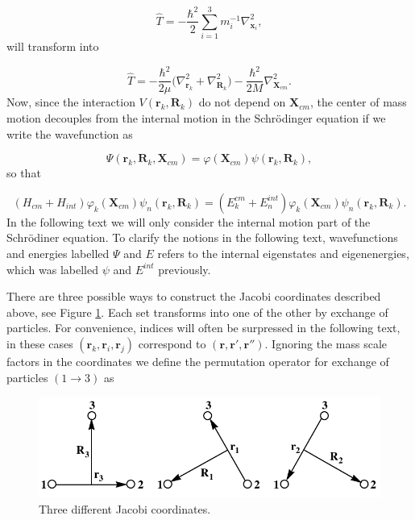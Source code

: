 \documentclass{article}
\begin{document}
\begin{equation}\label{eq:5}
\hat{T} = -\frac{\hbar^2}{2} \sum_{i=1}^{3} m_{i}^{-1} \nabla^{2}_{\mathbf{x}_{i}}, 
\end{equation}
will transform into

\begin{equation}\label{eq:6}
\hat{T} = -\frac{\hbar^2}{2\mu} \Big(\nabla^{2}_{\mathbf{r}_{k}}+\nabla^{2}_{\mathbf{R}_{k}}\Big) - \frac{\hbar^2}{2 M}\nabla^{2}_{\mathbf{X}_{cm}}. 
\end{equation}
Now, since the interaction $V(\mathbf{r}_k,\mathbf{R}_k)$ do not depend on $\mathbf{X}_{cm}$, the center of mass motion decouples from the internal motion in the Schr{\"o}dinger equation if we write the wavefunction as

\begin{equation}
\Psi(\mathbf{r}_k,\mathbf{R}_k,\mathbf{X}_{cm}) = \varphi(\mathbf{X}_{cm})\psi(\mathbf{r}_k,\mathbf{R}_k),
\end{equation}
so that

\begin{equation}
(H_{cm} + H_{int})\varphi_{k}(\mathbf{X}_{cm})\psi_{n}(\mathbf{r}_k,\mathbf{R}_k) = (E_k^{cm} + E_n^{int})\varphi_{k}(\mathbf{X}_{cm})\psi_{n}(\mathbf{r}_k,\mathbf{R}_k).
\end{equation}
In the following text we will only consider the internal motion part of the  Schr{\"o}diner equation. To clarify the notions in the following text, wavefunctions and energies labelled $\Psi$ and $E$ refers to the internal eigenstates and eigenenergies, which was labelled $\psi$ and $E^{int}$ previously. 

There are three possible ways to construct the Jacobi coordinates described above, see Figure \ref{fig:2}. Each set transforms into one of the other by exchange of particles. For convenience, indices will often be surpressed in the following text, in these cases $(\mathbf{r}_{k}, \mathbf{r}_{i}, \mathbf{r}_{j})$ correspond to $(\mathbf{r}, \mathbf{r}', \mathbf{r}'')$. Ignoring the mass scale factors in the coordinates we define the permutation operator for exchange of particles $(1 \rightarrow 3)$ as 

\begin{figure}
	\includegraphics[width=\linewidth]{jacobii.pdf}
	\caption{Three different Jacobi coordinates.}
	\label{fig:2}
\end{figure}
\end{document}
